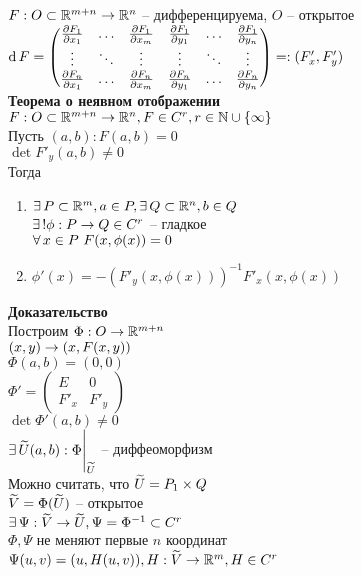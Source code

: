 \documentclass[12pt]{article}
\newcommand{\ppart}[2]{\frac{\partial #1}{\partial #2}}
\begin{document}
$F:O\subset \mathbb{R}^{m+n} \rightarrow \mathbb{R}^n$ -- дифференцируема, $O$ -- открытое\\
$\df F = \begin{pmatrix}
    \ppart {F_1}{x_1} & \ldots & \ppart {F_1}{x_m} & \ppart {F_1}{y_1} & \ldots & \ppart {F_1}{y_n}\\
    \vdots & \ddots & \vdots & \vdots & \ddots & \vdots\\
    \ppart {F_n}{x_1} & \ldots & \ppart {F_n}{x_m} & \ppart {F_n}{y_1} & \ldots & \ppart {F_n}{y_n}
\end{pmatrix} =: (F'_x, F'_y)$\\
\textbf{Теорема о неявном отображении}\\
$F: O \subset \mathbb{R}^{m+n} \rightarrow \mathbb{R}^n, F \in C^r, r \in \mathbb{N} \cup \{\infty\}$\\
Пусть $(a, b): F(a,b) = 0$\\
$\det F'_y(a,b)\neq 0$\\
Тогда 
\begin{enumerate}
    \item $\exists\, P \subset \mathbb{R}^m, a \in P, \exists\, Q \subset \mathbb{R}^n, b \in Q$\\
    $\exists\,! \phi: P \rightarrow Q \in C^r$ -- гладкое\\
    $\forall\, x \in P\ F(x, \phi(x)) = 0$
    \item $\phi'(x) = -(F'_y(x,\phi(x)))^{-1}F'_x(x,\phi(x))$
\end{enumerate}
\textbf{Доказательство}\\
Построим $\Phi: O \rightarrow \mathbb{R}^{m+n}$\\
$(x,y) \rightarrow (x, F(x, y))$\\
$\Phi(a,b) = (0,0)$\\
$\Phi' = \begin{pmatrix}
    E & 0\\
    F'_x & F'_y
\end{pmatrix}$\\
$\det \Phi'(a,b) \neq 0$\\
$\exists\, \widetilde U(a,b): \Phi\Biggr|_{\widetilde U}$ -- диффеоморфизм\\
Можно считать, что $\widetilde U = P_1 \times Q$\\
$\widetilde V = \Phi(\widetilde U)$ -- открытое\\
$\exists\, \Psi: \widetilde V \rightarrow \widetilde U, \Psi = \Phi^{-1}\subset C^r$\\
$\Phi, \Psi$ не меняют первые $n$ координат\\
$\Psi(u,v) = (u, H(u,v)), H: \widetilde V \rightarrow \mathbb{R}^m, H \in C^r$\\
\end{document}
